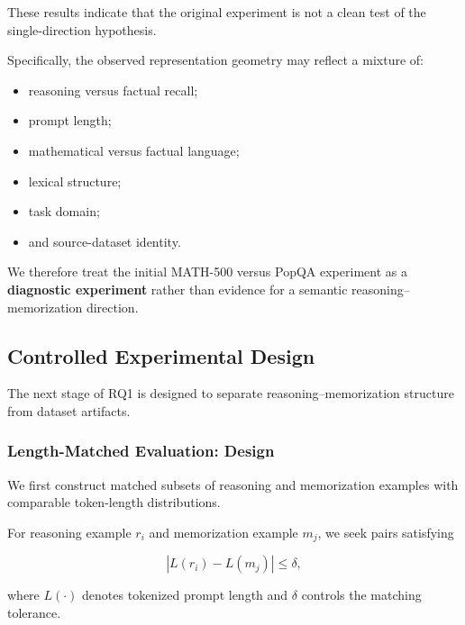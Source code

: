 \documentclass[11pt]{article}
\begin{document}
These results indicate that the original experiment is not a clean
test of the single-direction hypothesis.

Specifically, the observed representation geometry may reflect a
mixture of:

\begin{itemize}

    \item reasoning versus factual recall;

    \item prompt length;

    \item mathematical versus factual language;

    \item lexical structure;

    \item task domain;

    \item and source-dataset identity.

\end{itemize}

We therefore treat the initial MATH-500 versus PopQA experiment as a
\textbf{diagnostic experiment} rather than evidence for a semantic
reasoning--memorization direction.


\subsection{Controlled Experimental Design}

The next stage of RQ1 is designed to separate reasoning--memorization
structure from dataset artifacts.


\subsubsection{Length-Matched Evaluation: Design}

We first construct matched subsets of reasoning and memorization
examples with comparable token-length distributions.

For reasoning example \(r_i\) and memorization example \(m_j\), we
seek pairs satisfying

\[
|L(r_i)-L(m_j)| \leq \delta,
\]

where \(L(\cdot)\) denotes tokenized prompt length and \(\delta\)
controls the matching tolerance.
\end{document}
